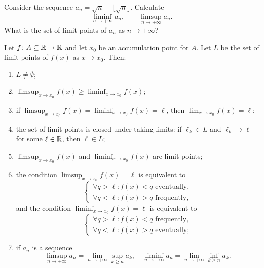 \begin{exercise}
  Consider the sequence $a_n = \sqrt n -\lfloor \sqrt n\rfloor$.
  Calculate 
  \[
    \liminf_{n\to+\infty} a_n, \qquad 
    \limsup_{n\to+\infty} a_n.
  \]
  What is the set of limit points of $a_n$ as $n\to +\infty$?
\end{exercise}

%
\begin{theorem}
Let $f\colon A\subseteq {\mathbb R} \to {\mathbb R}$ and let $x_0$ be an accumulation point for
$A$.
Let $L$ be the set of limit points of $f(x)$ as $x\to x_0$. 
Then:
\begin{enumerate}
  \item %
  $L\neq \emptyset$;

  \item %
  $\displaystyle\limsup_{x\to x_0} f(x) \ge \liminf_{x\to x_0} f(x)$;

  \item %
  if $\displaystyle\limsup_{x\to x_0} f(x) = \liminf_{x\to x_0} f(x) = \ell$, 
  then $\displaystyle\lim_{x\to x_0} f(x) = \ell$;

  \item %
  the set of limit points is closed under taking limits:
  if $\ell_k\in L$ and $\ell_k \to \ell$ for some $\ell \in \bar {{\mathbb R}}$, 
  then $\ell \in L$;

  \item %
    $\displaystyle\limsup_{x\to x_0} f(x)$ and $\displaystyle\liminf_{x\to x_0}
  f(x)$ are limit points;

  \item %
  the condition
  $\displaystyle\limsup_{x\to x_0} f(x) = \ell$ is equivalent to
  \[
  \begin{cases}
   \forall q > \ell \colon f(x) < q \text{ eventually,} \\
   \forall q < \ell \colon f(x) > q \text{ frequently,}
  \end{cases}
  \]
    and the condition $\displaystyle\liminf_{x\to x_0} f(x) = \ell$ is
  equivalent to
  \[
  \begin{cases}
  \forall q > \ell \colon f(x) < q \text{ frequently,} \\
  \forall q < \ell \colon f(x) > q \text{ eventually;}
  \end{cases}
  \]

  \item %
  if $a_n$ is a sequence 
  \[
    \limsup_{n\to +\infty} a_n = \lim_{n\to +\infty} \sup_{k\ge n} a_k,
    \quad
    \liminf_{n\to +\infty} a_n = \lim_{n\to +\infty} \inf_{k\ge n} a_k.
  \]
 \end{enumerate}
\end{theorem}

